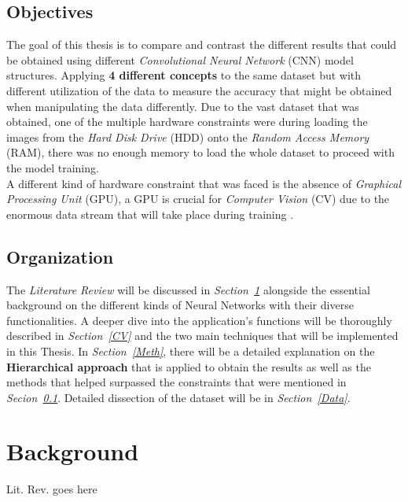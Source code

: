 \documentclass[12pt]{extarticle}
\begin{document}
	\subsection{Objectives}\label{Obj}
	The goal of this thesis is to compare and contrast the different results that could be obtained using different \emph{Convolutional Neural Network} (CNN) model structures. Applying \textbf{4 different concepts} to the same dataset but with different utilization of the data to measure the accuracy that might be obtained when manipulating the data differently. Due to the vast dataset that was obtained, one of the multiple hardware constraints were during loading the images from the \emph{Hard Disk Drive} (HDD) onto the \emph{Random Access Memory} (RAM), there was no enough memory to load the whole dataset to proceed with the model training. \\[5mm]
	A different kind of hardware constraint that was faced is the absence of \emph{Graphical Processing Unit} (GPU), a GPU is crucial for \emph{Computer Vision} (CV) due to the enormous data stream that will take place during training \cite{GPU}.
	\subsection{Organization}\label{Org}
	The \emph{Literature Review} will be discussed in \emph{Section~\ref{Lit. Rev.}} alongside the essential background on the different kinds of Neural Networks with their diverse functionalities. A deeper dive into the application's functions will be thoroughly described in \emph{Section~\ref{CV}} and the two main techniques that will be implemented in this Thesis. In \emph{Section~\ref{Meth}}, there will be a detailed explanation on the \textbf{Hierarchical approach} that is applied to obtain the results as well as the methods that helped surpassed the constraints that were mentioned in \emph{Secion~\ref{Obj}}. Detailed dissection of the dataset will be in \emph{Section~\ref{Data}}.
	\newpage
	\section{Background}\label{Lit. Rev.}
	Lit. Rev. goes here
\end{document}
